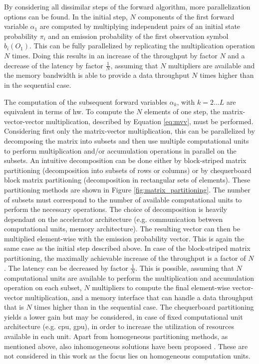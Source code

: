 \documentclass[mscthesis]{usiinfthesis}
\begin{document}
By considering all dissimilar steps of the forward algorithm, more
parallelization options can be found. In the initial step, $N$ components of
the first forward variable $\alpha_1$ are computed by multiplying independent
pairs of an initial state probability $\pi_i$ and an emission probability of
the first observation symbol $b_i(O_1)$. This can be fully parallelized by
replicating the multiplication operation $N$ times. Doing this results in an
increase of the throughput by factor $N$ and a decrease of the latency by
factor $\frac{1}{N}$, assuming that $N$ multipliers are available and the
memory bandwidth is able to provide a data throughput $N$ times higher than in
the sequential case.

The computation of the subsequent forward variables $\alpha_k$, with $k
= 2 \dots L$ are equivalent in terms of \gls{hw}. To compute the $N$ elements
of one step, the matrix-vector-vector multiplication, described by Equation
\ref{eq:mvv}, must be performed. Considering first only the matrix-vector
multiplication, this can be parallelized by decomposing the matrix into subsets
and then use multiple computational units to perform multiplication and/or
accumulation operations in parallel on the subsets. An intuitive decomposition
can be done either by block-striped matrix partitioning (decomposition into
subsets of rows or columns) or by chequerboard block matrix partitioning
(decomposition in rectangular sets of elements). These partitioning methods are
shown in Figure \ref{fig:matrix_partitioning}. The number of subsets must
correspond to the number of available computational units to perform the
necessary operations. The choice of decomposition is heavily dependant on the
accelerator architecture (e.g. communication between computational units,
memory architecture). The resulting vector can then be multiplied element-wise
with the emission probability vector. This is again the same case as the
initial step described above. In case of the block-striped matrix partitioning,
the maximally achievable increase of the throughput is a factor of $N$. The
latency can be decreased by factor $\frac{1}{N}$. This is possible, assuming
that $N$ computational units are available to perform the multiplication and
accumulation operation on each subset, $N$ multipliers to compute the final
element-wise vector-vector multiplication, and a memory interface that can
handle a data throughput that is $N$ times higher than in the sequential case.
The chequerboard partitioning yields a lower gain but may be considered, in
case of fixed computational unit architecture (e.g. \gls{cpu}, \gls{gpu}), in
order to increase the utilization of resources available in each unit. Apart
from homogeneous partitioning methods, as mentioned above, also inhomogeneous
solutions have been proposed \cite{IPDPSW12_DeFlumere, clarke11}. These are
not considered in this work as the focus lies on homogeneous computation
units.
\end{document}
